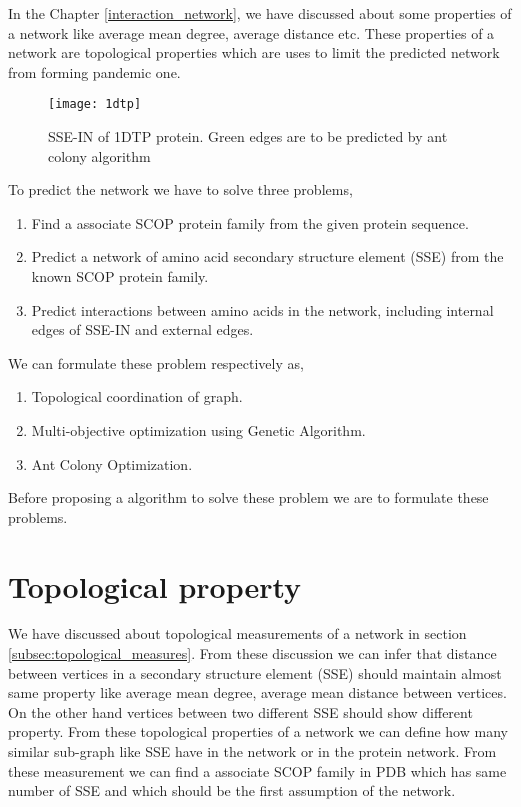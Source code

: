 In the Chapter \ref{interaction_network}, we have discussed about some properties of a network like average mean degree, average distance etc. These properties of a network are topological properties which are uses to limit the predicted network from forming pandemic one.
\begin{figure}
\centering
\texttt{[image: 1dtp]}
\caption {SSE-IN of 1DTP protein. Green edges are to be predicted by ant colony algorithm}
\label {fig:1dtp}
\end{figure}
To predict the network we have to solve three problems,
\begin{enumerate}
\item Find a associate SCOP protein family from the given protein sequence.
\item Predict a network of amino acid secondary structure element (SSE) from the known SCOP protein family.
\item Predict interactions between amino acids in the network, including internal edges of SSE-IN and external edges.
\end{enumerate}
We can formulate these problem respectively as,
\begin{enumerate}
\item Topological coordination of graph.
\item Multi-objective optimization using Genetic Algorithm.
\item Ant Colony Optimization.
\end{enumerate}
Before proposing a algorithm to solve these problem we are to formulate these problems. 

\section {Topological property}
We have discussed about topological measurements of a network in section \ref{subsec:topological_measures}. From these discussion we can infer that distance between vertices in a secondary structure element (SSE) should maintain almost same property like average mean degree, average mean distance between vertices. On the other hand vertices between two different SSE should show different property. From these topological properties of a network we can define how many similar sub-graph like SSE have in the network or in the protein network. From these measurement we can find a associate SCOP family in PDB which has same number of SSE and which should be the first assumption of the network.

